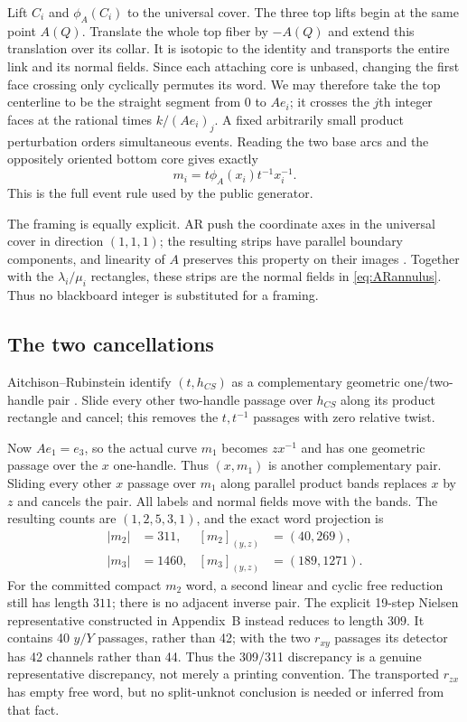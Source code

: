 Lift $C_i$ and $\phi_A(C_i)$ to the universal cover.  The three top lifts
begin at the same point $A(Q)$.  Translate the whole top fiber by $-A(Q)$ and
extend this translation over its collar.  It is isotopic to the identity and
transports the entire link and its normal fields.  Since each attaching core
is unbased, changing the first face crossing only cyclically permutes its
word.  We may therefore take the top centerline to be the straight segment
from $0$ to $Ae_i$; it crosses the $j$th integer faces at
the rational times $k/(Ae_i)_j$.  A fixed arbitrarily small product
perturbation orders simultaneous events.  Reading the two base arcs and the
oppositely oriented bottom core gives exactly
\begin{equation}\label{eq:actualword}
m_i=t\phi_A(x_i)t^{-1}x_i^{-1}.
\end{equation}
This is the full event rule used by the public generator.

The framing is equally explicit.  AR push the coordinate axes in the
universal cover in direction $(1,1,1)$; the resulting strips have parallel
boundary components, and linearity of $A$ preserves this property on their
images \cite[pp.~16--17]{AitchisonRubinstein1984}.  Together with the
$\lambda_i/\mu_i$ rectangles, these strips are the normal fields in
\eqref{eq:ARannulus}.  Thus no blackboard integer is substituted for a
framing.

\subsection{The two cancellations}

Aitchison--Rubinstein identify $(t,h_{CS})$ as a complementary geometric
one/two-handle pair \cite[p.~7]{AitchisonRubinstein1984}.  Slide every other
two-handle passage over $h_{CS}$ along its product rectangle and cancel; this
removes the $t,t^{-1}$ passages with zero relative twist.

Now $Ae_1=e_3$, so the actual curve $m_1$ becomes $zx^{-1}$ and has one
geometric passage over the $x$ one-handle.  Thus $(x,m_1)$ is another
complementary pair.  Sliding every other $x$ passage over $m_1$ along parallel
product bands replaces $x$ by $z$ and cancels the pair.  All labels and
normal fields move with the bands.  The resulting counts are $(1,2,5,3,1)$,
and the exact word projection is
\[
\begin{aligned}
|m_2|&=311, & [m_2]_{(y,z)}&=(40,269),\\
|m_3|&=1460, & [m_3]_{(y,z)}&=(189,1271).
\end{aligned}
\]
For the committed compact $m_2$ word, a second linear and cyclic free
reduction still has length $311$; there is no adjacent inverse pair.  The
explicit 19-step Nielsen representative constructed in Appendix~B instead
reduces to length $309$.  It contains 40 $y/Y$ passages, rather than 42; with
the two $r_{xy}$ passages its detector has 42 channels rather than 44.  Thus
the 309/311 discrepancy is a genuine representative discrepancy, not merely
a printing convention.
The transported $r_{zx}$ has empty free word, but no split-unknot conclusion
is needed or inferred from that fact.

